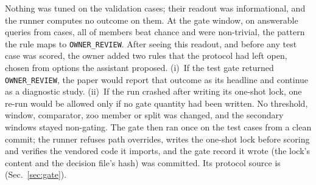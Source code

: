 Nothing was tuned on the validation cases; their readout was
informational, and the runner computes no outcome on them. At the gate window,
on  answerable queries from  cases, all
 of  members beat chance and 
were non-trivial, the pattern the rule maps to \texttt{OWNER\_REVIEW}. After
seeing this readout, and before any test case was scored, the owner added two
rules that the protocol had left open, chosen from options the assistant
proposed. (i)~If the test gate returned
\texttt{OWNER\_REVIEW}, the paper would report that outcome as its headline
and continue as a diagnostic study. (ii)~If the run crashed after writing its
one-shot lock, one re-run would be allowed only if no gate quantity had been
written. No threshold, window, comparator, zoo member or split was changed,
and the secondary windows stayed non-gating. The gate then ran once on the
test cases from a clean commit; the runner refuses path overrides, writes
the one-shot lock before scoring and verifies the vendored code it imports,
and the gate record it wrote (the lock's content and the decision file's
hash) was committed. Its protocol source is
\texttt{} (Sec.~\ref{sec:gate}).
